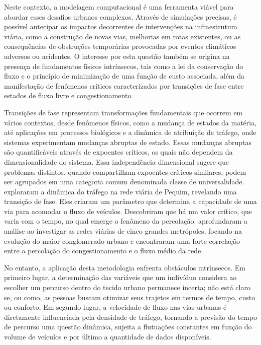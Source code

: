 \documentclass{article}
\begin{document}

Neste contexto, a modelagem computacional é uma ferramenta viável para abordar esses desafios urbanos complexos. Através de simulações precisas, é possível antecipar os impactos decorrentes de intervenções na infraestrutura viária, como a construção de novas vias, melhorias em rotas existentes, ou as consequências de obstruções temporárias provocadas por eventos climáticos adversos ou acidentes. O interesse por esta questão também se origina na presença de fundamentos físicos intrínsecos, tais como a lei da conservação do fluxo e o princípio de minimização de uma função de custo associada, além da manifestação de fenômenos críticos caracterizados por transições de fase entre estados de fluxo livre e congestionamento. 


Transições de fase representam transformações fundamentais que ocorrem em vários contextos, desde fenômenos físicos, como a mudança de estados da matéria, até aplicações em processos biológicos e a dinâmica de atribuição de tráfego, onde sistemas experimentam mudanças abruptas de estado. Essas mudanças abruptas são quantificáveis através de expoentes críticos, os quais não dependem da dimensionalidade do sistema. Essa independência dimensional sugere que problemas distintos, quando compartilham expoentes críticos similares, podem ser agrupados em uma categoria comum denominada classe de universalidade. 
\citet{Li2014,Zeng2018} exploraram a dinâmica do tráfego na rede viária de Pequim, revelando uma transição de fase. Eles criaram um parâmetro que determina a capacidade de uma via para acomodar o fluxo de veículos. Descobriram que há um valor crítico, que varia com o tempo, no qual emerge o fenômeno da percolação. \citet{Ambhl2023} aprofundaram a análise ao investigar as redes viárias de cinco grandes metrópoles, focando na evolução do maior conglomerado urbano e encontraram uma forte correlação entre a percolação do congestionamento e o fluxo médio da rede.

No entanto, a aplicação desta metodologia enfrenta obstáculos intrínsecos. Em primeiro lugar, a determinação das variáveis que um indivíduo considera ao escolher um percurso dentro do tecido urbano permanece incerta; não está claro se, ou como, as pessoas buscam otimizar seus trajetos em termos de tempo, custo ou conforto. Em segundo lugar, a velocidade de fluxo nas vias urbanas é diretamente influenciada pela densidade de tráfego, tornando a previsão do tempo de percurso uma questão dinâmica, sujeita a flutuações constantes em função do volume de veículos e por último a quantidade de dados disponíveis.
\end{document}
